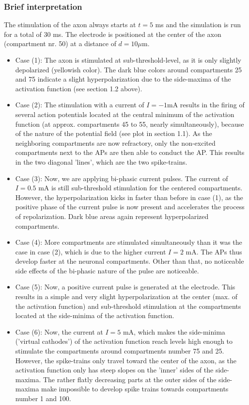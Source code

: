 \documentclass[
a4paper, 
12pt, 
]{article}
\begin{document}
\subsubsection*{Brief interpretation}
The stimulation of the axon always starts at $t = 5$ ms and the simulation is run for a total of 30 ms. The electrode is positioned at the center of the axon (compartment nr. 50) at a distance of $d = 10\mu$m.
\begin{itemize}
	\item Case (1): The axon is stimulated at sub-threshold-level, as it is only slightly depolarized (yellowish color). The dark blue colors around compartments 25 and 75 indicate a slight hyperpolarization due to the side-maxima of the activation function (see section 1.2 above). 
	\item Case (2): The stimulation with a current of $I= -1$mA results in the firing of several action potentials located at the central minimum of the activation function (at approx. compartments  45 to 55, nearly simultaneously), because of the nature of the potential field (see plot in section 1.1). As the neighboring compartments are now refractory, only the non-excited compartments next to the APs are then able to conduct the AP. This results in the two diagonal 'lines', which are the two spike-trains. 
	\item Case (3): Now, we are applying bi-phasic current pulses. The current of $I= 0.5$ mA is still sub-threshold stimulation for the centered compartments. However, the hyperpolarization kicks in faster than before in case (1), as the positive phase of the current pulse is now present and accelerates the process of repolarization. Dark blue areas again represent hyperpolarized compartments. 
	\item Case (4): More compartments are stimulated simultaneously than it was the case in case (2), which is due to the higher current $I = 2$ mA. The APs thus develop faster at the neuronal compartments. Other than that, no noticeable side effects of the bi-phasic nature of the pulse are noticeable. 
	\item Case (5): Now, a positive current pulse is generated at the electrode. This results in a simple and very slight hyperpolarization at the center (max. of the activation function) and sub-threshold stimulation at the compartments located at the side-minima of the activation function. 
	\item Case (6): Now, the current at $I =5$ mA, which makes the side-minima ('virtual cathodes') of the activation function reach levels high enough to stimulate the compartments around compartments number 75 and 25. However, the spike-trains only travel toward the center of the axon, as the activation function only has steep slopes on the 'inner' sides of the side-maxima. The rather flatly decreasing parts at the outer sides of the side-maxima make impossible to develop spike trains towards compartments number 1 and 100.\\

\end{itemize}
\end{document}
